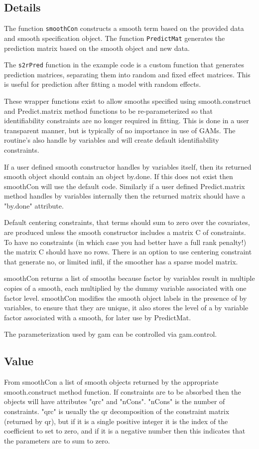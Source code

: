 \documentclass{article}
\begin{document}
\subsection{Details}
The function \texttt{smoothCon} constructs a smooth term based on the provided data and smooth specification object. The function \texttt{PredictMat} generates the prediction matrix based on the smooth object and new data.

The \texttt{s2rPred} function in the example code is a custom function that generates prediction matrices, separating them into random and fixed effect matrices. This is useful for prediction after fitting a model with random effects.

These wrapper functions exist to allow smooths specified using smooth.construct and Predict.matrix method functions to be re-parameterized so that identifiability constraints are no longer required in fitting. This is done in a user transparent manner, but is typically of no importance in use of GAMs. The routine's also handle by variables and will create default identifiability constraints.

If a user defined smooth constructor handles by variables itself, then its returned smooth object should contain an object by.done. If this does not exist then smoothCon will use the default code. Similarly if a user defined Predict.matrix method handles by variables internally then the returned matrix should have a "by.done" attribute.

Default centering constraints, that terms should sum to zero over the covariates, are produced unless the smooth constructor includes a matrix C of constraints. To have no constraints (in which case you had better have a full rank penalty!) the matrix C should have no rows. There is an option to use centering constraint that generate no, or limited infil, if the smoother has a sparse model matrix.

smoothCon returns a list of smooths because factor by variables result in multiple copies of a smooth, each multiplied by the dummy variable associated with one factor level. smoothCon modifies the smooth object labels in the presence of by variables, to ensure that they are unique, it also stores the level of a by variable factor associated with a smooth, for later use by PredictMat.

The parameterization used by gam can be controlled via gam.control.


\subsection{Value}
From smoothCon a list of smooth objects returned by the appropriate smooth.construct method function. If constraints are to be absorbed then the objects will have attributes "qrc" and "nCons". "nCons" is the number of constraints. "qrc" is usually the qr decomposition of the constraint matrix (returned by qr), but if it is a single positive integer it is the index of the coefficient to set to zero, and if it is a negative number then this indicates that the parameters are to sum to zero.
\end{document}
